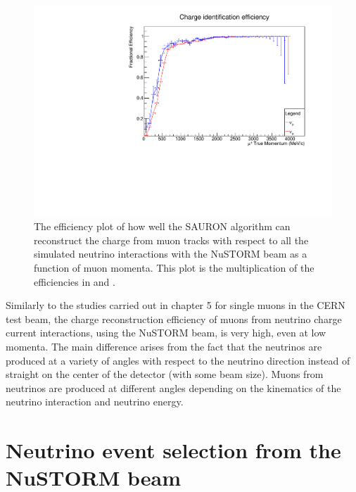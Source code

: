 \begin{figure}[h!]
\centering
\includegraphics[width=.9\textwidth]{figures/NeutrinoChap/CombinedNuStormChargeFittedEff.pdf}
\caption{The efficiency plot of how well the SAURON algorithm can reconstruct the charge from muon tracks with respect to all the simulated neutrino interactions with the NuSTORM beam as a function of muon momenta. This plot is the multiplication of the efficiencies in  and .}
\label{fig:NuSTORMTASDCombined}
\end{figure}

Similarly to the studies carried out in chapter 5 for single muons in the CERN test beam, the charge reconstruction efficiency of muons from neutrino charge current interactions, using the NuSTORM beam, is very high, even at low momenta. The main difference arises from the fact that the neutrinos are produced at a variety of angles with respect to the neutrino direction instead of straight on the center of the detector (with some beam size). Muons from neutrinos are produced at different angles depending on the kinematics of the neutrino interaction and neutrino energy. 

\section{Neutrino event selection from the NuSTORM beam}


